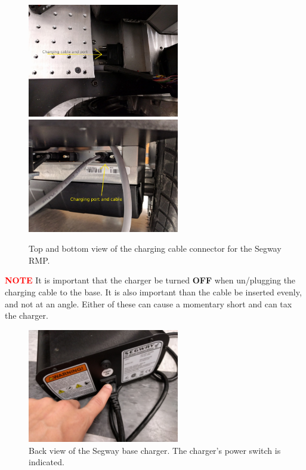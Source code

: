 \begin{figure}[h!] 
  \centering
  \includegraphics[width=250px]{figures/base_charging_cable_top.jpg}
  \includegraphics[width=250px]{figures/base_charging_cable_bottom.jpg}
  \caption{Top and bottom view of the charging cable connector for the Segway RMP.}
  \label{fig:base_charger}
\end{figure}

\clearpage

\textbf{\textcolor{red}{NOTE}} It is important that the charger be turned \textbf{OFF} when un/plugging the charging cable to the base. It is also important than the cable be inserted evenly, and not at an angle. Either of these can cause a momentary short and can tax the charger.

\begin{figure}[h!] 
  \centering
  \includegraphics[width=250px]{figures/base_charger_turn_on.jpg}
  \caption{Back view of the Segway base charger. The charger's power switch is indicated.}
  \label{fig:base_charger_power}
\end{figure}

